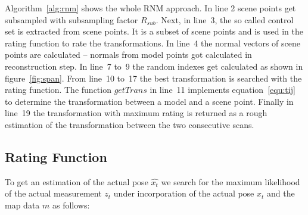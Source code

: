 \documentclass[conference]{IEEEtran}
\begin{document}
Algorithm~\ref{alg:rnm} shows the whole RNM approach. In line 2 scene points get subsampled with subsampling factor $R_{sub}$.  Next, in line~3, the so called control set is extracted from scene points. It is a subset of scene points and is used in the rating function to rate the transformations.  In line~4 the normal vectors of scene points are calculated -- normals from model points got calculated in reconstruction step. In line~7 to~9 the random indexes get calculated as shown in figure~\ref{fig:span}. From line~10 to~17 the best transformation is searched with the rating function. The function $getTrans$ in line~11 implements equation~\ref{equ:tij} to determine the transformation between a model and a scene point. Finally in line~19 the transformation with maximum rating is returned as a rough estimation of the transformation between the two consecutive scans.


%
%

\subsection{Rating Function}
To get an estimation of the actual pose $\widehat{x_t}$  we search for the maximum likelihood of the actual measurement $z_t$ under incorporation of the actual pose $x_t$ and the map data $m$ as follows:
\end{document}
